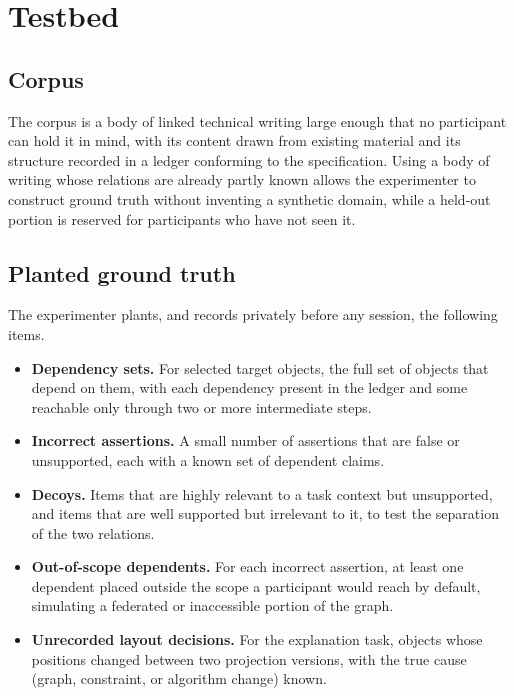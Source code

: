\documentclass[11pt]{article}
\theoremstyle{definition}
\begin{document}
\section{Testbed}

\subsection{Corpus}

The corpus is a body of linked technical writing large enough that no participant can hold it in mind, with its content drawn from existing material and its structure recorded in a ledger conforming to the specification. Using a body of writing whose relations are already partly known allows the experimenter to construct ground truth without inventing a synthetic domain, while a held-out portion is reserved for participants who have not seen it.

\subsection{Planted ground truth}

The experimenter plants, and records privately before any session, the following items.

\begin{itemize}[leftmargin=1.5em]
\item \textbf{Dependency sets.} For selected target objects, the full set of objects that depend on them, with each dependency present in the ledger and some reachable only through two or more intermediate steps.
\item \textbf{Incorrect assertions.} A small number of assertions that are false or unsupported, each with a known set of dependent claims.
\item \textbf{Decoys.} Items that are highly relevant to a task context but unsupported, and items that are well supported but irrelevant to it, to test the separation of the two relations.
\item \textbf{Out-of-scope dependents.} For each incorrect assertion, at least one dependent placed outside the scope a participant would reach by default, simulating a federated or inaccessible portion of the graph.
\item \textbf{Unrecorded layout decisions.} For the explanation task, objects whose positions changed between two projection versions, with the true cause (graph, constraint, or algorithm change) known.
\end{itemize}
\end{document}
